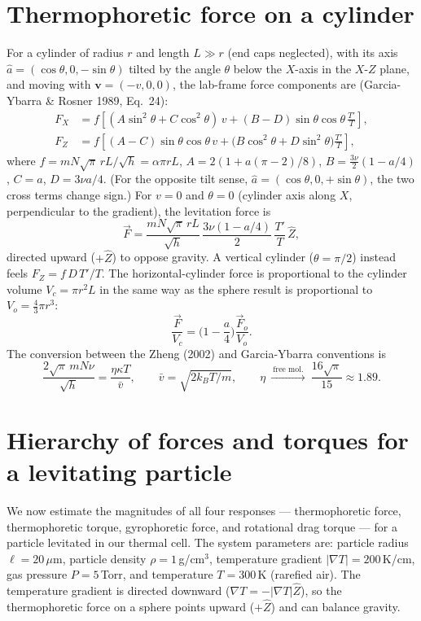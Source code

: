 \documentclass[11pt]{article}
\newcommand{\chg}[1]{\marginpar{\raggedright\footnotesize\textcolor{red!70!black}{\textsf{#1}}}}
\newcommand{\vect}[1]{\bm{#1}}
\begin{document}
\section{Thermophoretic force on a cylinder}
For a cylinder of radius $r$ and length $L\gg r$ (end caps neglected), with its axis $\hat a=(\cos\theta,0,-\sin\theta)$ tilted by the angle $\theta$ below the $X$-axis in the $X$-$Z$ plane, and moving with $\vect v=(-v,0,0)$, the lab-frame force components are (Garcia-Ybarra \& Rosner 1989, Eq.~24):\chg{C16}
\begin{align}
  F_X &= f\left[(A\sin^2\theta+C\cos^2\theta)\,v+(B-D)\sin\theta\cos\theta\,\frac{T'}{T}\right],\\
  F_Z &= f\left[(A-C)\sin\theta\cos\theta\,v+\big(B\cos^2\theta+D\sin^2\theta\big)\frac{T'}{T}\right],
\end{align}
where $f=mN\sqrt\pi\,rL/\sqrt h=\alpha\pi rL$, $A=2(1+a(\pi-2)/8)$, $B=\frac{3\nu}{2}(1-a/4)$, $C=a$, $D=3\nu a/4$. (For the opposite tilt sense, $\hat a=(\cos\theta,0,+\sin\theta)$, the two cross terms change sign.) For $v=0$ and $\theta=0$ (cylinder axis along $X$, perpendicular to the gradient), the levitation force is
\begin{equation}
  \vec F=\frac{mN\sqrt\pi\,rL}{\sqrt h}\,\frac{3\nu(1-a/4)}{2}\,\frac{T'}{T}\,\hat Z,
\end{equation}
directed upward ($+\hat Z$) to oppose gravity. A vertical cylinder ($\theta=\pi/2$) instead feels $F_Z=f\,D\,T'/T$. The horizontal-cylinder force is proportional to the cylinder volume $V_c=\pi r^2L$ in the same way as the sphere result is proportional to $V_o=\frac43\pi r^3$:
\begin{equation}
  \frac{\vec F}{V_c}=\Big(1-\frac a4\Big)\frac{\vec F_o}{V_o}.
\end{equation}
The conversion between the Zheng (2002) and Garcia-Ybarra conventions is\chg{C17}
\begin{equation}
  \frac{2\sqrt\pi\,mN\nu}{\sqrt h}=\frac{\eta\kappa T}{\bar v},\qquad \bar v=\sqrt{2k_BT/m},\qquad \eta\ \xrightarrow{\ \text{free mol.}\ }\ \frac{16\sqrt\pi}{15}\approx1.89 .
\end{equation}

\section{Hierarchy of forces and torques for a levitating particle}
We now estimate the magnitudes of all four responses --- thermophoretic force, thermophoretic torque, gyrophoretic force, and rotational drag torque --- for a particle levitated in our thermal cell. The system parameters are: particle radius $\ell=20\,\mu$m, particle density $\rho=1\,$g/cm$^3$, temperature gradient $|\nabla T|=200\,$K/cm, gas pressure $P=5\,$Torr, and temperature $T=300\,$K (rarefied air). The temperature gradient is directed downward ($\nabla T=-|\nabla T|\hat Z$), so the thermophoretic force on a sphere points upward ($+\hat Z$) and can balance gravity.
\end{document}

